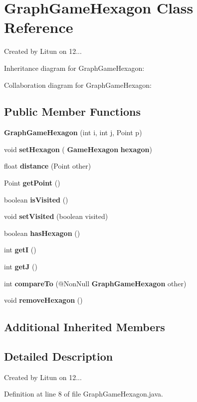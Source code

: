 \section{Graph\+Game\+Hexagon Class Reference}
\label{classsf_1_1unitingtwist_1_1_graph_game_hexagon}


Created by Litun on 12...  




Inheritance diagram for Graph\+Game\+Hexagon\+:


Collaboration diagram for Graph\+Game\+Hexagon\+:
\subsection*{Public Member Functions}
\begin{DoxyCompactItemize}
\item 
\textbf{ Graph\+Game\+Hexagon} (int i, int j, Point p)
\item 
void \textbf{ set\+Hexagon} (\textbf{ Game\+Hexagon} \textbf{ hexagon})
\item 
float \textbf{ distance} (Point other)
\item 
Point \textbf{ get\+Point} ()
\item 
boolean \textbf{ is\+Visited} ()
\item 
void \textbf{ set\+Visited} (boolean visited)
\item 
boolean \textbf{ has\+Hexagon} ()
\item 
int \textbf{ getI} ()
\item 
int \textbf{ getJ} ()
\item 
int \textbf{ compare\+To} (@Non\+Null \textbf{ Graph\+Game\+Hexagon} other)
\item 
void \textbf{ remove\+Hexagon} ()
\end{DoxyCompactItemize}
\subsection*{Additional Inherited Members}


\subsection{Detailed Description}
Created by Litun on 12... 

Definition at line 8 of file Graph\+Game\+Hexagon.\+java.



